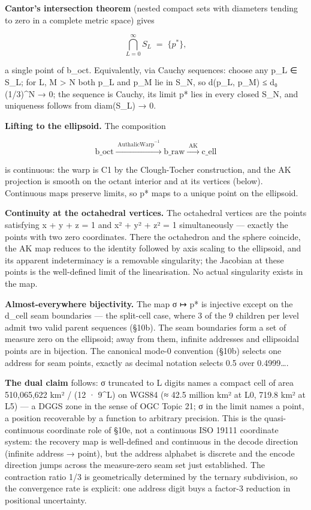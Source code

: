 \documentclass[
  11pt,
  a4paper,
]{article}
\begin{document}
\textbf{Cantor's intersection theorem} (nested compact sets with
diameters tending to zero in a complete metric space) gives

\[\bigcap_{L=0}^{\infty} S_L \;=\; \{p^{*}\},\]

a single point of b\_oct. Equivalently, via Cauchy sequences: choose any
p\_L ∈ S\_L; for L, M \textgreater{} N both p\_L and p\_M lie in S\_N,
so d(p\_L, p\_M) ≤ d₀ (1/3)\^{}N → 0; the sequence is Cauchy, its limit
p* lies in every closed S\_N, and uniqueness follows from diam(S\_L) →
0.

\textbf{Lifting to the ellipsoid.} The composition

\[\text{b\_oct} \xrightarrow{\;\text{AuthalicWarp}^{-1}\;} \text{b\_raw}
  \xrightarrow{\;\text{AK}\;} \text{c\_ell}\]

is continuous: the warp is C1 by the Clough-Tocher construction, and the
AK projection is smooth on the octant interior and at its vertices
(below). Continuous maps preserve limits, so p* maps to a unique point
on the ellipsoid.

\textbf{Continuity at the octahedral vertices.} The octahedral vertices
are the points satisfying \textbar x\textbar{} + \textbar y\textbar{} +
\textbar z\textbar{} = 1 and x² + y² + z² = 1 simultaneously --- exactly
the points with two zero coordinates. There the octahedron and the
sphere coincide, the AK map reduces to the identity followed by axis
scaling to the ellipsoid, and its apparent indeterminacy is a removable
singularity; the Jacobian at these points is the well-defined limit of
the linearisation. No actual singularity exists in the map.

\textbf{Almost-everywhere bijectivity.} The map σ ↦ p* is injective
except on the d\_cell seam boundaries --- the split-cell case, where 3
of the 9 children per level admit two valid parent sequences (§10b). The
seam boundaries form a set of measure zero on the ellipsoid; away from
them, infinite addresses and ellipsoidal points are in bijection. The
canonical mode-0 convention (§10b) selects one address for seam points,
exactly as decimal notation selects 0.5 over 0.4999\ldots.

\textbf{The dual claim} follows: σ truncated to L digits names a compact
cell of area 510,065,622 km² / (12 · 9\^{}L) on WGS84 (≈ 42.5 million
km² at L0, 719.8 km² at L5) --- a DGGS zone in the sense of OGC Topic
21; σ in the limit names a point, a position recoverable by a function
to arbitrary precision. This is the quasi-continuous coordinate role of
§10e, not a continuous ISO 19111 coordinate system: the recovery map is
well-defined and continuous in the decode direction (infinite address →
point), but the address alphabet is discrete and the encode direction
jumps across the measure-zero seam set just established. The contraction
ratio 1/3 is geometrically determined by the ternary subdivision, so the
convergence rate is explicit: one address digit buys a factor-3
reduction in positional uncertainty.
\end{document}
